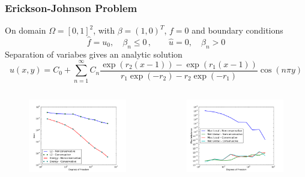 \documentclass[mathserif]{beamer}
\begin{document}
\begin{frame}
\frametitle{Erickson-Johnson Problem}
On domain $\Omega=[0,1]^2$, with $\beta=(1,0)^T$, $f=0$ and boundary
conditions
\[
\hat f=u_0,\quad\beta_n\le0\,,\quad\quad\hat u=0,\quad\beta_n > 0
\]
Separation of variabes gives an analytic solution
\[
u(x,y)=C_0+\sum_{n=1}^\infty C_n
\frac{\exp(r_2(x-1))-\exp(r_1(x-1))}{r_1\exp(-r_2)-r_2\exp(-r_1)}
\cos(n\pi y)
\]
\vspace{-5ex}
\begin{columns}[b]
\begin{column}{0.5\textwidth}
\begin{figure}[t]
\centering
\includegraphics[width=1.0\textwidth]{../figs/Erickson/robustError.pdf}

\end{figure}
\end{column}
\begin{column}{0.5\textwidth}
\begin{figure}[t]
\centering
\includegraphics[width=1.0\textwidth]{../figs/Erickson/robustFlux.pdf}

\end{figure}
\end{column}
\end{columns}
\end{frame}
\end{document}
